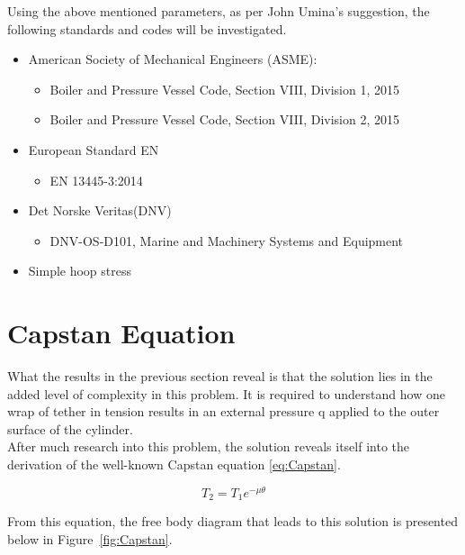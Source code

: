 Using the above mentioned parameters, as per John Umina's suggestion, the following standards and codes will be investigated.
\begin{itemize}
    \item American Society of Mechanical Engineers (ASME):
	    \begin{itemize}[label=$\bullet$]
	    	\item Boiler and Pressure Vessel Code, Section VIII, Division 1, 2015 \citep{ASMEbvpcVII1}
	    	\item Boiler and Pressure Vessel Code, Section VIII, Division 2, 2015 \citep{ASMEbvpcVII2}
	    \end{itemize}
    \item European Standard EN
        \begin{itemize}[label=$\bullet$]
	       	\item EN 13445-3:2014 \citep{EN134453}
	    \end{itemize}
	\item Det Norske Veritas(DNV) \citep{DNVOSD101}
		    \begin{itemize}[label=$\bullet$]
	    	\item DNV-OS-D101, Marine and Machinery Systems and Equipment\citep{ASMEbvpcVII1}
	    \end{itemize}
	\item Simple hoop stress \citep{roarks}	
\end{itemize}


\section{Capstan Equation}
What the results in the previous section reveal is that the solution lies in the added level of complexity in this problem. It is required to understand how one wrap of tether in tension results in an external pressure q applied to the outer surface of the cylinder.\\

After much research into this problem, the solution reveals itself into the derivation of the well-known Capstan equation \ref{eq:Capstan}.

\begin{equation}
	\label{eq:Capstan}
	T_2 = T_1 e^{-\mu\theta}
\end{equation}


From this equation, the free body diagram that leads to this solution is presented below in Figure~\ref{fig:Capstan}. 

